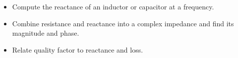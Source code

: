 \begin{objectives}
\begin{itemize}[leftmargin=1.4em,itemsep=2pt]
\item Compute the reactance of an inductor or capacitor at a frequency.
\item Combine resistance and reactance into a complex impedance and find its magnitude and phase.
\item Relate quality factor to reactance and loss.
\end{itemize}
\end{objectives}
